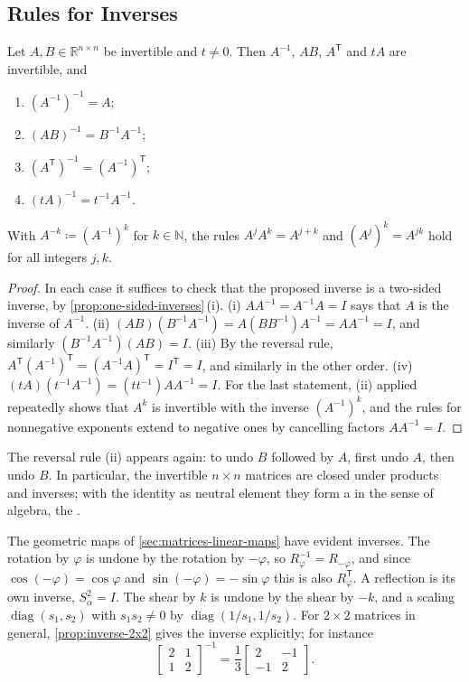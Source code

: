 \subsection{Rules for Inverses}

\begin{proposition}
\label{prop:inverse-rules}
Let $A,B\in\mathbb R^{n\times n}$ be invertible and $t\ne0$. Then $A^{-1}$, $AB$, $A^{\mathsf T}$ and $tA$ are invertible, and
\begin{enumerate}
\item $(A^{-1})^{-1}=A$;
\item $(AB)^{-1}=B^{-1}A^{-1}$;
\item $(A^{\mathsf T})^{-1}=(A^{-1})^{\mathsf T}$;
\item $(tA)^{-1}=t^{-1}A^{-1}$.
\end{enumerate}
With $A^{-k}\coloneqq(A^{-1})^k$ for $k\in\mathbb N$, the rules $A^jA^k=A^{j+k}$ and $(A^j)^k=A^{jk}$ hold for all integers $j,k$.
\end{proposition}

\begin{proof}
In each case it suffices to check that the proposed inverse is a two-sided inverse, by \cref{prop:one-sided-inverses}\,(i). (i) $AA^{-1}=A^{-1}A=I$ says that $A$ is the inverse of $A^{-1}$. (ii) $(AB)(B^{-1}A^{-1})=A(BB^{-1})A^{-1}=AA^{-1}=I$, and similarly $(B^{-1}A^{-1})(AB)=I$. (iii) By the reversal rule, $A^{\mathsf T}(A^{-1})^{\mathsf T}=(A^{-1}A)^{\mathsf T}=I^{\mathsf T}=I$, and similarly in the other order. (iv) $(tA)(t^{-1}A^{-1})=(tt^{-1})AA^{-1}=I$. For the last statement, (ii) applied repeatedly shows that $A^k$ is invertible with the inverse $(A^{-1})^k$, and the rules for nonnegative exponents extend to negative ones by cancelling factors $AA^{-1}=I$.
\end{proof}

The reversal rule (ii) appears again: to undo $B$ followed by $A$, first undo $A$, then undo $B$. In particular, the invertible $n\times n$ matrices are closed under products and inverses; with the identity as neutral element they form a  in the sense of algebra, the .

The geometric maps of \cref{sec:matrices-linear-maps} have evident inverses. The rotation by $\varphi$ is undone by the rotation by $-\varphi$, so $R_\varphi^{-1}=R_{-\varphi}$, and since $\cos(-\varphi)=\cos\varphi$ and $\sin(-\varphi)=-\sin\varphi$ this is also $R_\varphi^{\mathsf T}$. A reflection is its own inverse, $S_\alpha^2=I$. The shear by $k$ is undone by the shear by $-k$, and a scaling $\operatorname{diag}(s_1,s_2)$ with $s_1s_2\ne0$ by $\operatorname{diag}(1/s_1,1/s_2)$. For $2\times2$ matrices in general, \cref{prop:inverse-2x2} gives the inverse explicitly; for instance
\[
\begin{bmatrix}2&1\\1&2\end{bmatrix}^{-1}=\frac13\begin{bmatrix}2&-1\\-1&2\end{bmatrix}.
\]

